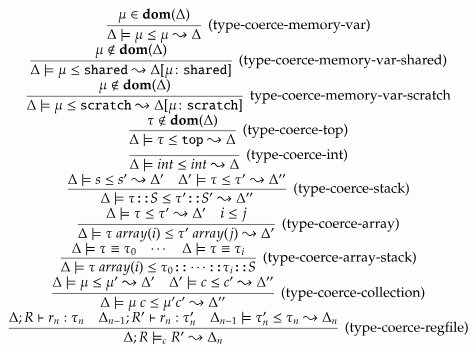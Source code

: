 \begin{equation*}
\begin{array}{c}
        \infer[(\text{type-coerce-memory-var})]
            {\Delta \models \mu \leq \mu \leadsto \Delta}
            {\mu \in \dom(\Delta)}
        \\
        \infer[(\text{type-coerce-memory-var-shared})]
            {
                \Delta \models
                \mu \leq \shared
                \leadsto \Delta[\mu \colon \shared]}
            {\mu \not \in \dom(\Delta)}
        \\
        \infer[\text{type-coerce-memory-var-scratch}]
            {
                \Delta \models
                \mu \leq \scratch
                \leadsto \Delta[\mu \colon \scratch]}
            {\mu \not \in \dom(\Delta)}
        \\
        \infer[(\text{type-coerce-top})]
            {\Delta \models \tau \leq \ttop \leadsto \Delta}
            {\tau \not \in \dom(\Delta)}
        \\
        \infer[(\text{type-coerce-int})]
            {\Delta \models int \leq int \leadsto \Delta}
            {}
        \\
        \infer[(\text{type-coerce-stack})]
            {
                \Delta \models
                \tau \cons S
                \leq
                \tau' \cons S'
                \leadsto \Delta''
            }
            {
                \Delta \models s \leq s' \leadsto \Delta' &
                \Delta' \models \tau \leq \tau' \leadsto \Delta''
            }
        \\
        \infer[(\text{type-coerce-array})]
            {
                \Delta \models
                \tau\ array(i)
                \leq
                \tau'\ array(j)
                \leadsto \Delta'
            }
            {
                \Delta \models \tau \leq \tau' \leadsto \Delta' &
                i \leq j
            }
        \\
        \infer[(\text{type-coerce-array-stack})]
            {
                \Delta
                \models
                \tau\ array(i)
                \leq
                \tau_0 \cons \cdots \cons \tau_i \cons S
            }
            {
                \Delta \models \tau \equiv \tau_0 &
                \cdots &
                \Delta \models \tau \equiv \tau_i
            }
        \\
        \infer[(\text{type-coerce-collection})]
            {\Delta \models \mu\ c \leq \mu' c' \leadsto \Delta''}
            {
                \Delta \models \mu \leq \mu' \leadsto \Delta' &
                \Delta' \models c \leq c' \leadsto \Delta''
            }
        \\
        \infer[(\text{type-coerce-regfile})]
            {\Delta; R \models_c R' \leadsto \Delta_n}
            {
                \Delta; R \vdash r_n : \tau_n &
                \Delta_{n - 1}; R' \vdash r_n : \tau'_n &
                \Delta_{n - 1} \models \tau'_n \leq \tau_n \leadsto \Delta_n
            }
    \end{array}
\end{equation*}
